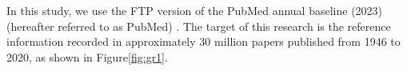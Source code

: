 In this study, we use the FTP version of the PubMed annual baseline (2023) (hereafter referred to as PubMed) \cite{PM1}. The target of this research is the reference information recorded in approximately 30 million papers published from 1946 to 2020, as shown in Figure\ref{fig:gr1}.
